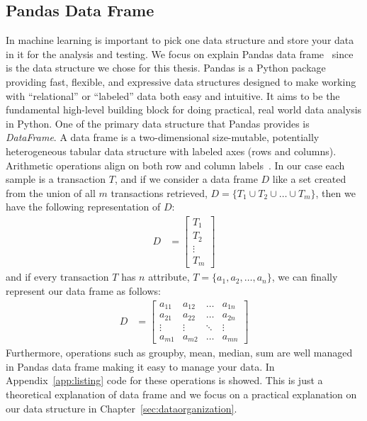 \documentclass[USenglish]{uit-thesis}
\begin{document}
\subsection{Pandas Data Frame}
\label{sec:pandas}
In machine learning is important to
pick one data structure and store your data in it for
the analysis and testing. We focus on
explain Pandas data frame~\cite{pandas}
since is the data structure we chose for this thesis.
Pandas is a Python package providing fast,
flexible, and expressive data structures designed
to make working with “relational” or “labeled” data
both easy and intuitive. It aims to be the fundamental
high-level building block for doing practical,
real world data analysis in Python.
One of the primary data structure that Pandas
provides is \emph{DataFrame}. A data frame is
a two-dimensional size-mutable, potentially
heterogeneous tabular data structure with
labeled axes (rows and columns). Arithmetic
operations align on both row and
column labels~\cite{pandas}.
In our case each sample is a transaction $T$, and
if we consider a data frame $D$ like a set created
from the union
of all $m$ transactions retrieved, $D = \{ T_1 \cup T_2 \cup \dots \cup T_m\}$,
then we have the following representation of $D$:
\begin{align}
D &=\begin{bmatrix}
T_{1}\\
T_{2}\\
\vdots\\
T_{m}
\end{bmatrix} 
\end{align}
and if every transaction $T$ has $n$ attribute,
$T = \{a_1, a_2, \dots, a_n\}$,
we can finally represent our data frame as follows:
\begin{align}
\label{eq:dataframe}
D &=\begin{bmatrix}
a_{11} & a_{12} & \dots & a_{1n}\\
a_{21} & a_{22} & \dots & a_{2n}\\
\vdots & \vdots & \ddots & \vdots\\
a_{m1} & a_{m2} & \dots & a_{mn}
\end{bmatrix}
\end{align}
Furthermore, operations such as groupby, mean, median,
sum are well managed in Pandas data frame making it easy
to manage your data. In Appendix~\ref{app:listing} code
for these operations is showed.
This is just a theoretical explanation of data frame and
we focus on a practical explanation on our data structure
in Chapter~\ref{sec:dataorganization}.
\end{document}
